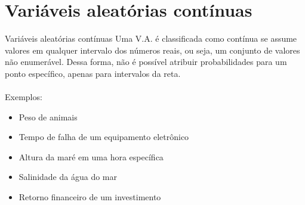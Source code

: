 \documentclass[10pt]{beamer}\usepackage[]{graphicx}\usepackage[]{color}
\theoremstyle{definition}
\begin{document}




\section[V.A.s Contínuas]{Variáveis aleatórias contínuas}

\begin{frame}[fragile]{Variáveis aleatórias contínuas}
  Uma V.A. é classificada como contínua se assume valores em qualquer
  intervalo dos números reais, ou seja, um conjunto de valores não
  enumerável. Dessa forma, não é possível atribuir probabilidades para
  um ponto específico, apenas para intervalos da reta. \\~\\
  Exemplos:
  \begin{itemize}
  \item Peso de animais
  \item Tempo de falha de um equipamento eletrônico
  \item Altura da maré em uma hora específica
  \item Salinidade da água do mar
  \item Retorno financeiro de um investimento
  \end{itemize}
\end{frame}
\end{document}
